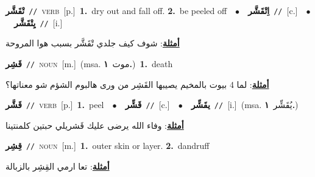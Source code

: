\documentclass[10pt,a4paper,twoside]{article} %
\begin{document}
\begin{multicols}{2}
{\setlength\topsep{0pt}\textbf{\foreignlanguage{arabic}{تْقَشَّر}}\ {\color{gray}\texttt{//}\color{black}}\ \textsc{verb}\ [p.]\ \textbf{1.}~dry out and fall off.  \textbf{2.}~be peeled off\ \ $\bullet$\ \ \setlength\topsep{0pt}\textbf{\foreignlanguage{arabic}{اِتْقَشَّر}}\ {\color{gray}\texttt{//}\color{black}}\ [c.]\ \ $\bullet$\ \ \setlength\topsep{0pt}\textbf{\foreignlanguage{arabic}{يِتْقَشَّر}}\ {\color{gray}\texttt{//}\color{black}}\ [i.]\  \begin{flushright}\color{gray}\foreignlanguage{arabic}{\textbf{\underline{\foreignlanguage{arabic}{أمثلة}}}: شوف كيف جلدي تْقَشَّر بسبب هوا المروحة}\end{flushright}\color{black}} \vspace{2mm}

{\setlength\topsep{0pt}\textbf{\foreignlanguage{arabic}{قَشِر}}\ {\color{gray}\texttt{//}\color{black}}\ \textsc{noun}\ [m.]\ \color{gray}(msa. \foreignlanguage{arabic}{موت}~\foreignlanguage{arabic}{\textbf{١.}})\color{black}\ \textbf{1.}~death\  \begin{flushright}\color{gray}\foreignlanguage{arabic}{\textbf{\underline{\foreignlanguage{arabic}{أمثلة}}}: لما 4 بيوت بالمخيم يصيبها القَشِر من ورى هالبوم الشؤم شو معناتها؟}\end{flushright}\color{black}} \vspace{2mm}

{\setlength\topsep{0pt}\textbf{\foreignlanguage{arabic}{قَشَّر}}\ {\color{gray}\texttt{//}\color{black}}\ \textsc{verb}\ [p.]\ \textbf{1.}~peel\ \ $\bullet$\ \ \setlength\topsep{0pt}\textbf{\foreignlanguage{arabic}{قَشِّر}}\ {\color{gray}\texttt{//}\color{black}}\ [c.]\ \ $\bullet$\ \ \setlength\topsep{0pt}\textbf{\foreignlanguage{arabic}{يقَشِّر}}\ {\color{gray}\texttt{//}\color{black}}\ [i.]\ \color{gray}(msa. \foreignlanguage{arabic}{يُقَشِّر}~\foreignlanguage{arabic}{\textbf{١.}})\color{black}\  \begin{flushright}\color{gray}\foreignlanguage{arabic}{\textbf{\underline{\foreignlanguage{arabic}{أمثلة}}}: وفاء الله يرضى عليك قَشريلي حبتين كلمنتينا}\end{flushright}\color{black}} \vspace{2mm}

{\setlength\topsep{0pt}\textbf{\foreignlanguage{arabic}{قِشِر}}\ {\color{gray}\texttt{//}\color{black}}\ \textsc{noun}\ [m.]\ \textbf{1.}~outer skin or layer.  \textbf{2.}~dandruff\  \begin{flushright}\color{gray}\foreignlanguage{arabic}{\textbf{\underline{\foreignlanguage{arabic}{أمثلة}}}: تعا ارمي القِشِر بالزبالة}\end{flushright}\color{black}} \vspace{2mm}


\end{multicols}
\end{document}
